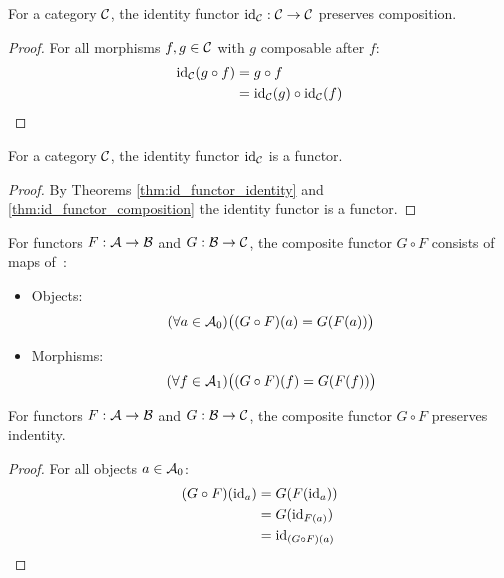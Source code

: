 \begin{theorem}\label{thm:id_functor_composition}

  For a category $\mathcal{C}$, the identity functor $\mathrm{id}_{\mathcal{C}}: \mathcal{C} \to \mathcal{C}$ preserves
  composition.

  \begin{proof}
    For all morphisms $f,g\in \mathcal{C}$ with $g$ composable after $f$:
    \[
      \begin{aligned}
        \mathrm{id}_{\mathcal{C}}(g\circ f)
        &= g\circ f\\
        &= \mathrm{id}_{\mathcal{C}}(g) \circ \mathrm{id}_{\mathcal{C}}(f)
      \end{aligned}
    \]
  \end{proof}
\end{theorem}

\begin{theorem}[$\id_\C$ is a Functor]
  For a category $\mathcal{C}$, the identity functor $\id_\C$ is a functor.

  \begin{proof}
    By Theorems \ref{thm:id_functor_identity} and
    \ref{thm:id_functor_composition} the identity functor is a functor.
  \end{proof}
\end{theorem}

\begin{definition}\label{def:functor_composition}

  For functors $F:\mathcal{A}\to \mathcal{B}$ and $G:\mathcal{B}\to \mathcal{C}$, the composite functor $G\circ F$
  consists of maps of~\parencite[p.~17]{leinster:basic_category_theory}:
  \begin{itemize}
    \item Objects:
      \[(\forall a \in \mathcal{A}_0)
        \big((G\circ F)(a) = G(F(a))\big)\]
    \item Morphisms:
      \[(\forall f\in \mathcal{A}_1)
        \big((G\circ F)(f) = G(F(f))\big)\]
  \end{itemize}
\end{definition}

\begin{theorem}
  For functors $F:\mathcal{A}\to \mathcal{B}$ and $G:\mathcal{B}\to \mathcal{C}$, the composite functor $G\circ F$
  preserves indentity.

  \begin{proof}
    For all objects $a\in \mathcal{A}_0$:
    \[
      \begin{aligned}
        (G\circ F)(\mathrm{id}_a)
        &= G(F(\mathrm{id}_a))\\
        &= G(\mathrm{id}_{F(a)})\\
        &= \mathrm{id}_{(G\circ F)(a)}
      \end{aligned}
    \]
  \end{proof}
\end{theorem}


